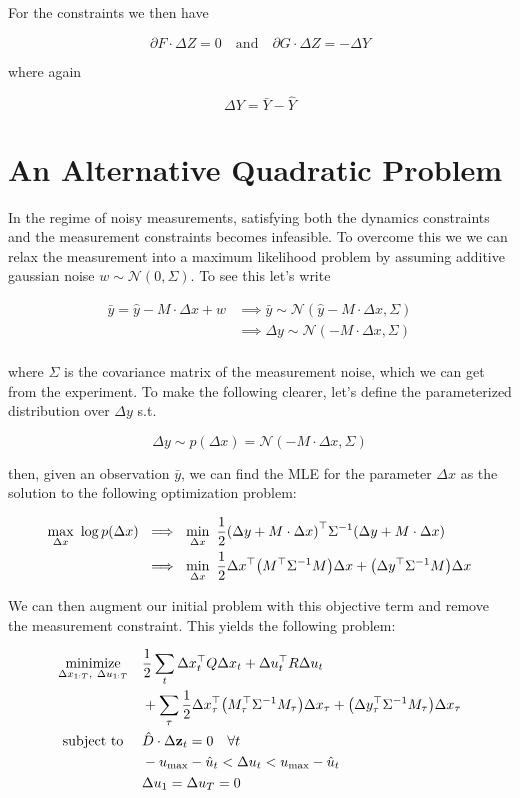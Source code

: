 \documentclass{article}
\begin{document}
For the constraints we then have

$$
\partial F \cdot \Delta Z = 0
\quad \text{and} \quad
\partial G \cdot \Delta Z = - \Delta Y
$$

where again

$$
\Delta Y = \bar Y - \hat Y
$$

\section*{An Alternative Quadratic Problem}

In the regime of noisy measurements, satisfying both the dynamics constraints and the measurement constraints becomes infeasible. To overcome this we we can relax the measurement into a maximum likelihood problem by assuming additive gaussian noise $w \sim \mathcal{N}(0, \Sigma)$.  To see this let's write

\begin{align*}
\bar y = \hat y - M \cdot \Delta x + w &\implies \bar y \sim \mathcal{N}(\hat y - M \cdot \Delta x, \Sigma) \\ 
&\implies \Delta y \sim \mathcal{N}(-M \cdot \Delta x, \Sigma) \\
\end{align*}

where $\Sigma$ is the covariance matrix of the measurement noise, which we can get from the experiment.  To make the following clearer, let's define the parameterized distribution over $\Delta y$ s.t. 

$$
\Delta y \sim p(\Delta x) = \mathcal{N}(-M \cdot \Delta x, \Sigma)
$$

then, given an observation $\bar y$, we can find the MLE for the parameter $\Delta x$ as the solution to the following optimization problem:

\begin{align*}
\max_{\Delta x} \ \log p(\Delta x) \ &\implies \ \min_{\Delta x} \ \frac{1}{2} \qty(\Delta y + M \cdot \Delta x)^\top \Sigma^{-1} \qty(\Delta y + M \cdot \Delta x) \\
&\implies \ \min_{\Delta x} \ \frac{1}{2} \Delta x^\top \qty(M^\top \Sigma^{-1} M) \Delta x + \qty(\Delta y^\top \Sigma^{-1} M) \Delta x 
\end{align*}

We can then augment our initial problem with this objective term and remove the measurement constraint.  This yields the following problem:

\begin{align*}
  \underset{\Delta x_{1:T},\ \Delta u_{1:T}}{\text{minimize}} & \quad \frac{1}{2} \sum_t \Delta x^\top_t Q \Delta x_t + \Delta u^\top_t R \Delta u_t \\
  & \quad + \sum_\tau \frac{1}{2} \Delta x_\tau^\top \qty(M_\tau^\top \Sigma^{-1} M_\tau) \Delta x_\tau + \qty(\Delta y_\tau^\top \Sigma^{-1} M_\tau) \Delta x_\tau \\
  \text{subject to} \ 
  & \quad \hat D \cdot \Delta {\vb{z}}_t = 0 \quad \forall t \\
  & \quad -u_\text{max} - \hat u_t < \Delta u_t < u_\text{max} - \hat u_t \\
  & \quad \Delta u_1 = \Delta u_T = 0
\end{align*}
\end{document}
